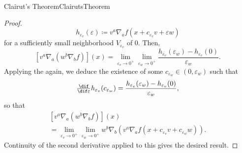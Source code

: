 \begin{thm}{Clairut's Theorem}{ClairutsTheorem}
\begin{proof}
\begin{equation}
h_{\varepsilon _v}(\varepsilon )\coloneqq v^a\nabla _af(x+c_{\varepsilon _v}v+\varepsilon w)
\end{equation}
for a sufficiently small neighborhood $V_{\varepsilon _v}$ of $0$.  Then,
\begin{equation*}
\left[ v^a\nabla _a(w^b\nabla _bf)\right] (x)=\lim _{\varepsilon _v\to 0^+}\lim _{\varepsilon _w\to 0^+}\frac{h_{\varepsilon _v}(\varepsilon _w)-h_{\varepsilon _v}(0)}{\varepsilon _w}.
\end{equation*}
Applying the  again, we deduce the existence of some $c_{\varepsilon _w}\in (0,\varepsilon _w)$ such that 
\begin{equation}
\tfrac{\dif}{\dif \varepsilon}h_{\varepsilon _v}(c_{\varepsilon _w})=\frac{h_{\varepsilon _v}(\varepsilon _w)-h_{\varepsilon _v}(0)}{\varepsilon _w}, 
\end{equation}
so that
\begin{equation*}
\begin{multlined}
\left[ v^a\nabla _a(w^b\nabla _bf)\right] (x) \\ =\lim _{\varepsilon _v\to 0^+}\lim _{\varepsilon _w\to 0^+}w^b\nabla _b\left( v^a\nabla _af(x+c_{\varepsilon _v}v+c_{\varepsilon _w}w)\right) .
\end{multlined}
\end{equation*}
Continuity of the second derivative applied to this gives the desired result.
\end{proof}
\end{thm}
